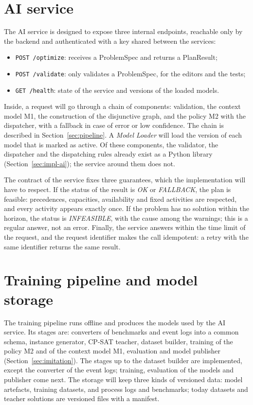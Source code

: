 \section{AI service}
\label{sec:ai-service}

The AI service is designed to expose three internal endpoints, reachable only by the backend and
authenticated with a key shared between the services:
\begin{itemize}
  \item \texttt{POST /optimize}: receives a ProblemSpec and returns a PlanResult;
  \item \texttt{POST /validate}: only validates a ProblemSpec, for the editors and the tests;
  \item \texttt{GET /health}: state of the service and versions of the loaded models.
\end{itemize}
Inside, a request will go through a chain of components: validation, the context model M1, the
construction of the disjunctive graph, and the policy M2 with the dispatcher, with a fallback in
case of error or low confidence. The chain is described in Section~\ref{sec:pipeline}. A
\emph{Model Loader} will load the version of each model that is marked as active. Of these
components, the validator, the dispatcher and the dispatching rules already exist as a Python
library (Section~\ref{sec:impl-ai}); the service around them does not.

The contract of the service fixes three guarantees, which the implementation will have to
respect. If the status of the result is \emph{OK} or
\emph{FALLBACK}, the plan is feasible: precedences, capacities, availability and fixed
activities are respected, and every activity appears exactly once. If the problem has no
solution within the horizon, the status is \emph{INFEASIBLE}, with the cause among the
warnings; this is a regular answer, not an error. Finally, the service answers within the time
limit of the request, and the request identifier makes the call idempotent: a retry with the
same identifier returns the same result.

\section{Training pipeline and model storage}
\label{sec:training-pipeline}

The training pipeline runs offline and produces the models used by the AI service. Its stages
are: converters of benchmarks and event logs into a common schema, instance generator, CP-SAT
teacher, dataset builder, training of the policy M2 and of the context model M1, evaluation and
model publisher (Section~\ref{sec:imitation}). The stages up to the dataset builder are
implemented, except the converter of the event logs; training, evaluation of the models and
publisher come next. The storage will keep three kinds of versioned data: model artefacts,
training datasets, and process logs and benchmarks; today datasets and teacher solutions are
versioned files with a manifest.

